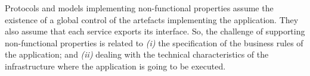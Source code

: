 
Protocols and models implementing non-functional properties assume the existence of a global control of the artefacts implementing the application.
They also assume that each service exports its interface.
So, the challenge of supporting non-functional properties is related to
\textit{(i)} the specification of the business rules of the application; and
\textit{(ii)} dealing with the technical characteristics of the infrastructure where the application is  going to be executed.

%


